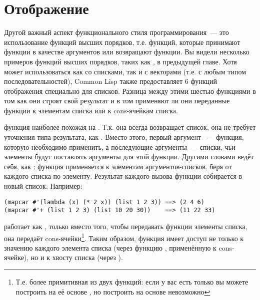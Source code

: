 \section{Отображение}
\label{sec:12-map}

Другой важный аспект функционального стиля программирования~--- это использование функций
высших порядков, т.е. функций, которые принимают функции в качестве аргументов или
возвращают функции. Вы видели несколько примеров функций высших порядков, таких как
, в предыдущей главе. Хотя  может использоваться как со списками, так
и с векторами (т.е. с любым типом последовательностей), Common Lisp также предоставляет 6
функций отображения специально для списков. Разница между этими шестью функциями в том как
они строят свой результат и в том применяют ли они переданные функции к элементам списка
или к cons-ячейкам списка.

 функция наиболее похожая на . Т.к. она всегда возвращает список,
она не требует уточнения типа результата, как . Вместо этого, первый аргумент
~--- функция, которую необходимо применить, а последующие аргументы~--- списки,
чьи элементы будут поставлять аргументы для этой функции. Другими словами 
ведёт себя, как : функция применяется к элементам аргументов-списков, беря от
каждого списка по элементу. Результат каждого вызова функции собирается в новый
список. Например:

\begin{lstlisting}
(mapcar #'(lambda (x) (* 2 x)) (list 1 2 3)) ==> (2 4 6)
(mapcar #'+ (list 1 2 3) (list 10 20 30))    ==> (11 22 33)
\end{lstlisting}

 работает как , только вместо того, чтобы передавать функции
элементы списка, она передаёт cons-ячейки\footnote{Т.е.  более примитивная
  из двух функций: если у вас есть только  вы можете построить на её основе
  , но построить  на основе  невозможно}.  Таким
образом, функция имеет доступ не только к значению каждого элемента списка (через функцию
, применённую к cons-ячейке), но и к хвосту списка (через ).

